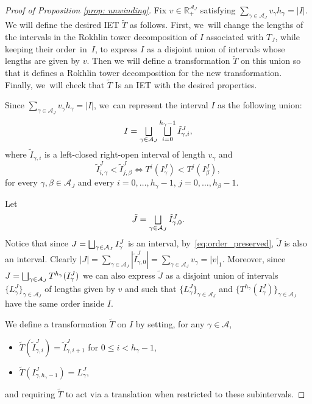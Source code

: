 \documentclass[JEP,XML,SOM,Unicode,NoEqCountersInSection,NoFloatCountersInSection,published]{cedram}
\let\oldbigsqcup\bigsqcup
\renewcommand{\bigsqcup}{\mathop{\textstyle\oldbigsqcup}\displaylimits}
\theoremstyle{plain}
\theoremstyle{definition}
\newcommand{\A}{\mathcal{A}}
\newcommand{\R}{\mathbb{R}}
\begin{document}
\begin{proof}[Proof of Proposition \ref{prop: unwinding}]
Fix $v \in \R^{\A_J}_+$ satisfying $\sum_{\gamma \in \A_J} v_\gamma h_\gamma = |I|$. We will define the desired IET $\tilde T$ as follows. First, we~will change the lengths of the intervals in the Rokhlin tower decomposition of $I$ associated with $T_J$, while keeping their order~in~$I$, to express $I$ as a disjoint union of intervals whose lengths are given by $v$. Then we will define a transformation $\tilde T$ on this union so that it defines a Rokhlin tower decomposition for the new transformation. Finally, we~will check that $\tilde T$ Is an IET with the desired properties.

Since $\sum_{\gamma \in \A_J} v_\gamma h_\gamma = |I|$, we~can represent the interval $I$ as the following union:
\begin{equation}
\label{eq:modified_towers}
I = \bigsqcup_{\gamma \in \A_J} \bigsqcup_{i = 0}^{h_\gamma - 1} \tilde I_{\gamma, i}^J,
\end{equation}
where $\tilde I_{\gamma, i}$ is a left-closed right-open interval of length $v_\gamma$ and
\begin{equation}\label{eq:order_preserved}
\tilde I_{i, \gamma}^J < \tilde I_{j, \beta}^J \iff T^i(I_\gamma^J) < T^j(I_\beta^J),
\end{equation}
for every $\gamma,\beta\in \A_J$ and every $i=0,\ldots, h_\gamma -1$, $j=0,\ldots, h_{\beta}-1$.

Let
\[
\tilde J = \bigsqcup_{\gamma \in \A_J} \tilde I_{\gamma, 0}^J.
\]
Notice that since $J = \bigsqcup_{\gamma \in \A_J} I_{\gamma}^J$ is an interval, by~\eqref{eq:order_preserved}, $\tilde J$ is also an interval. Clearly $|J| = \sum_{\gamma \in \A_J} |\tilde I_{\gamma, 0}^J| = \sum_{\gamma \in \A_J} v_\gamma = |v|_1$. Moreover, since $J = \bigsqcup_{\gamma \in \A_J} T^{h_\gamma}(I_{\gamma}^J)$ we can also express $\tilde J$ as a disjoint union of intervals $\{L^J_{\gamma}\}_{\gamma \in \A_J}$ of lengths given by $v$ and such that $\{L^J_{\gamma}\}_{\gamma \in \A_J}$ and $\{T^{h_\gamma}(I_{\gamma}^J)\}_{\gamma \in \A_J}$ have the same order inside $I$.

We define a transformation $\tilde T$ on $I$ by setting, for any $\gamma \in \A$,
\begin{itemize}
\item $\tilde{T}(\tilde I^J_{\gamma,i})=\tilde I^J_{\gamma,i+1}$ for $0\le i<h_{\gamma}-1$, \item $\tilde T(I^J_{\gamma, h_\gamma - 1}) = L_\gamma^J$,
\end{itemize}
and requiring $\tilde T$ to act via a translation when restricted to these subintervals.


\end{proof}
\end{document}
